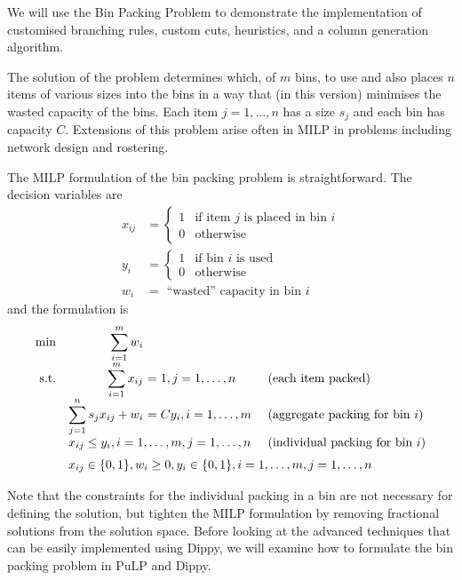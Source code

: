 We will use the Bin Packing Problem to demonstrate the implementation of customised branching rules, custom cuts, heuristics, and a column generation algorithm.

The solution of the problem determines which, of $m$ bins, to use and also places $n$ items of various sizes into the bins in a way that (in this version) minimises the wasted capacity of the bins.
Each item $j=1, \ldots, n$ has a size $s_j$ and each bin has capacity $C$.
Extensions of this problem arise often in \ac{MILP} in problems including network design and rostering.

The \ac{MILP} formulation of the bin packing problem is straightforward.
The decision variables are
\begin{align*}
x_{ij} &= \begin{cases} 1 & \text{if item $j$ is placed in bin $i$} \\
0 & \text{otherwise} \end{cases} \\
y_i &= \begin{cases} 1 & \text{if bin $i$ is used} \\
0 & \text{otherwise} \end{cases} \\
w_i &= \text{ ``wasted'' capacity in bin $i$}
\end{align*}
and the formulation is
\[
\begin{array}{rr@{\ }ll}
       \min & \displaystyle \sum_{i=1}^m w_i \\
\text{s.t.} & \displaystyle \sum_{i=1}^m x_{ij}           & = 1, j = 1, \ldots, n      & \text{ (each item packed)} \\
            & \displaystyle \sum_{j=1}^n s_j x_{ij} + w_i & = C y_i, i = 1, \ldots, m  & \text{ (aggregate packing for bin $i$)} \\
            & \multicolumn{2}{l}{x_{ij} \leq y_i, i = 1, \ldots, m, j = 1, \ldots, n}  & \text{ (individual packing for bin $i$)} \\[6pt]
            & \multicolumn{3}{l}{x_{ij} \in \{ 0, 1\}, w_i \geq 0, y_i \in \{0, 1\}, i = 1, \ldots, m, j = 1, \ldots, n}
\end{array}
\]

Note that the constraints for the individual packing in a bin are not necessary for defining the solution, but tighten the \ac{MILP} formulation by removing fractional solutions from the solution space. Before looking at the advanced techniques that can be easily implemented using Dippy, we will examine how to formulate the bin packing problem in PuLP and Dippy.

